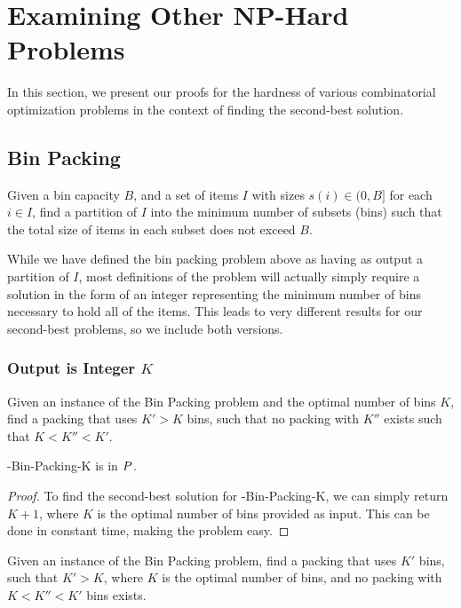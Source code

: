 \chapter{Examining Other NP-Hard Problems}
In this section, we present our proofs for the hardness of various combinatorial optimization problems in the context of finding the second-best solution.

\section{Bin Packing}
\begin{definition}
Given a bin capacity $B$, and a set of items $I$ with sizes $s(i) \in (0, B]$ for each $i \in I$, find a partition of $I$ into the minimum number of subsets (bins) such that the total size of items in each subset does not exceed $B$.
\end{definition}
While we have defined the bin packing problem above as having as output a partition of $I$, most definitions of the problem will actually simply require a solution in the form of an integer representing the minimum number of bins necessary to hold all of the items. This leads to very different results for our second-best problems, so we include both versions.
\subsection{Output is Integer $K$}
\begin{definition}
Given an instance of the Bin Packing problem and the optimal number of bins $K$, find a packing that uses $K' > K$ bins, such that no packing with $K''$ exists such that $ K < K'' < K'$.
\end{definition}

\begin{theorem}
\exob{}-Bin-Packing-K is in ${P}{}$.
\end{theorem}
\begin{proof}
To find the second-best solution for \exob{}-Bin-Packing-K, we can simply return $K+1$, where $K$ is the optimal number of bins provided as input. This can be done in constant time, making the problem easy.
\end{proof}

\begin{definition}
Given an instance of the Bin Packing problem, find a packing that uses $K'$ bins, such that $K' > K$, where $K$ is the optimal number of bins, and no packing with $K < K'' < K'$ bins exists.
\end{definition}

